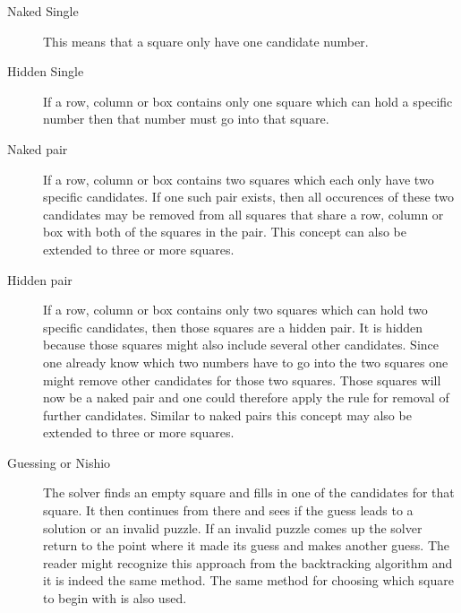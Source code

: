 \documentclass[a4paper,11pt]{kth-mag}
\begin{document}
\begin{description}
    \item[Naked Single] 
    This means that a square only have one candidate number.
    \item[Hidden Single] 
    If a row, column or box contains only one square which can hold a specific number then that number must go into that square.
    \item[Naked pair] 
    If a row, column or box contains two squares which each only have two specific candidates.
If one such pair exists, then all occurences of these two candidates may be removed from all squares that share a row, column or box with both of the squares in the pair.
This concept can also be extended to three or more squares.
    \item[Hidden pair]
    If a row, column or box contains only two squares which can hold two specific candidates, then those squares are a hidden pair.
It is hidden because those squares might also include several other candidates.
Since one already know which two numbers have to go into the two squares one might remove other candidates for those two squares.
Those squares will now be a naked pair and one could therefore apply the rule for removal of further candidates.
Similar to naked pairs this concept may also be extended to three or more squares.

    \item[Guessing or Nishio]
    The solver finds an empty square and fills in one of the candidates for that square.
    It then continues from there and sees if the guess leads to a solution or an invalid puzzle.
    If an invalid puzzle comes up the solver return to the point where it made its guess and makes another guess.
    The reader might recognize this approach from the backtracking algorithm and it is indeed the same method.
    The same method for choosing which square to begin with is also used.
    \end{description}
\end{document}
